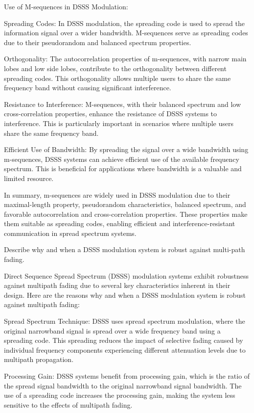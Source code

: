 Use of M-sequences in DSSS Modulation:

Spreading Codes:
In DSSS modulation, the spreading code is used to spread the information signal over a wider bandwidth. M-sequences serve as spreading codes due to their pseudorandom and balanced spectrum properties.

Orthogonality:
The autocorrelation properties of m-sequences, with narrow main lobes and low side lobes, contribute to the orthogonality between different spreading codes. This orthogonality allows multiple users to share the same frequency band without causing significant interference.

Resistance to Interference:
M-sequences, with their balanced spectrum and low cross-correlation properties, enhance the resistance of DSSS systems to interference. This is particularly important in scenarios where multiple users share the same frequency band.

Efficient Use of Bandwidth:
By spreading the signal over a wide bandwidth using m-sequences, DSSS systems can achieve efficient use of the available frequency spectrum. This is beneficial for applications where bandwidth is a valuable and limited resource.

In summary, m-sequences are widely used in DSSS modulation due to their maximal-length property, pseudorandom characteristics, balanced spectrum, and favorable autocorrelation and cross-correlation properties. These properties make them suitable as spreading codes, enabling efficient and interference-resistant communication in spread spectrum systems.






Describe why and when a DSSS modulation system is robust against multi-path fading.


Direct Sequence Spread Spectrum (DSSS) modulation systems exhibit robustness against multipath fading due to several key characteristics inherent in their design. Here are the reasons why and when a DSSS modulation system is robust against multipath fading:

Spread Spectrum Technique:
DSSS uses spread spectrum modulation, where the original narrowband signal is spread over a wide frequency band using a spreading code. This spreading reduces the impact of selective fading caused by individual frequency components experiencing different attenuation levels due to multipath propagation.

Processing Gain:
DSSS systems benefit from processing gain, which is the ratio of the spread signal bandwidth to the original narrowband signal bandwidth. The use of a spreading code increases the processing gain, making the system less sensitive to the effects of multipath fading.

